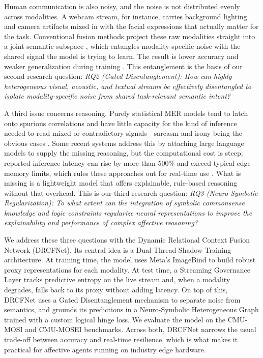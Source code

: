\documentclass[sn-mathphys,Numbered]{sn-jnl}
\theoremstyle{thmstyleone}
\theoremstyle{thmstyletwo}
\theoremstyle{thmstylethree}
\begin{document}
Human communication is also noisy, and the noise is not distributed evenly across modalities. A webcam stream, for instance, carries background lighting and camera artifacts mixed in with the facial expressions that actually matter for the task. Conventional fusion methods project these raw modalities straight into a joint semantic subspace \cite{zadeh2017tensor, tsai2019multimodal}, which entangles modality-specific noise with the shared signal the model is trying to learn. The result is lower accuracy and weaker generalization during training \cite{hazarika2020misa}. This entanglement is the basis of our second research question: \textit{RQ2 (Gated Disentanglement): How can highly heterogeneous visual, acoustic, and textual streams be effectively disentangled to isolate modality-specific noise from shared task-relevant semantic intent?}

A third issue concerns reasoning. Purely statistical MER models tend to latch onto spurious correlations and have little capacity for the kind of inference needed to read mixed or contradictory signals---sarcasm and irony being the obvious cases \cite{cambria2017affective}. Some recent systems address this by attaching large language models to supply the missing reasoning, but the computational cost is steep; reported inference latency can rise by more than 500\% and exceed typical edge memory limits, which rules these approaches out for real-time use \cite{chen2024emotionllama}. What is missing is a lightweight model that offers explainable, rule-based reasoning without that overhead. This is our third research question: \textit{RQ3 (Neuro-Symbolic Regularization): To what extent can the integration of symbolic commonsense knowledge and logic constraints regularize neural representations to improve the explainability and performance of complex affective reasoning?}

We address these three questions with the Dynamic Relational Context Fusion Network (DRCFNet). Its central idea is a Dual-Thread Shadow Training architecture. At training time, the model uses Meta's ImageBind \cite{girdhar2023imagebind} to build robust proxy representations for each modality. At test time, a Streaming Governance Layer tracks predictive entropy on the live stream and, when a modality degrades, falls back to its proxy without adding latency. On top of this, DRCFNet uses a Gated Disentanglement mechanism to separate noise from semantics, and grounds its predictions in a Neuro-Symbolic Heterogeneous Graph trained with a custom logical hinge loss. We evaluate the model on the CMU-MOSI \cite{zadeh2016mosi} and CMU-MOSEI \cite{zadeh2018multimodal} benchmarks. Across both, DRCFNet narrows the usual trade-off between accuracy and real-time resilience, which is what makes it practical for affective agents running on industry edge hardware.
\end{document}

